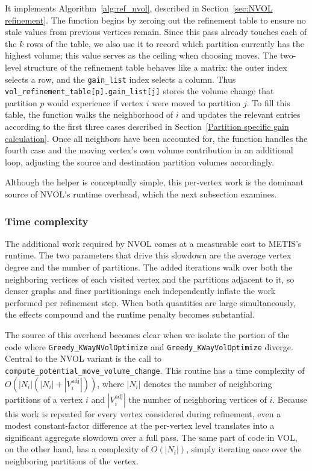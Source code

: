 It implements Algorithm~\ref{alg:ref_nvol}, described in Section~\ref{sec:NVOL refinement}. The function begins by zeroing out the refinement table to ensure no stale values from previous vertices remain. Since this pass already touches each of the $k$ rows of the table, we also use it to record which partition currently has the highest volume; this value serves as the ceiling when choosing moves. The two-level structure of the refinement table behaves like a matrix: the outer index selects a row, and the \texttt{gain\_list} index selects a column. Thus \texttt{vol\_refinement\_table[p].gain\_list[j]} stores the volume change that partition $p$ would experience if vertex $i$ were moved to partition $j$. To fill this table, the function walks the neighborhood of $i$ and updates the relevant entries according to the first three cases described in Section~\ref{Partition specific gain calculation}. Once all neighbors have been accounted for, the function handles the fourth case and the moving vertex's own volume contribution in an additional loop, adjusting the source and destination partition volumes accordingly.

Although the helper is conceptually simple, this per-vertex work is the dominant source of NVOL's runtime overhead, which the next subsection examines.

\subsubsection{Time complexity}
The additional work required by NVOL comes at a measurable cost to METIS's runtime. The two parameters that drive this slowdown are the average vertex degree and the number of partitions. The added iterations walk over both the neighboring vertices of each visited vertex and the partitions adjacent to it, so denser graphs and finer partitionings each independently inflate the work performed per refinement step. When both quantities are large simultaneously, the effects compound and the runtime penalty becomes substantial.

The source of this overhead becomes clear when we isolate the portion of the code where \texttt{Greedy\_KWayNVolOptimize} and \texttt{Greedy\_KWayVolOptimize} diverge. Central to the NVOL variant is the call to \texttt{compute\_potential\_move\_volume\_change}. This routine has a time complexity of $O\left(|N_i|(|N_i| + |V^{\mathrm{adj}}_i|)\right)$, where $|N_i|$ denotes the number of neighboring partitions of a vertex $i$ and $|V^{\mathrm{adj}}_i|$ the number of neighboring vertices of $i$. Because this work is repeated for every vertex considered during refinement, even a modest constant-factor difference at the per-vertex level translates into a significant aggregate slowdown over a full pass. The same part of code in VOL, on the other hand, has a complexity of $O(|N_i|)$, simply iterating once over the neighboring partitions of the vertex.

